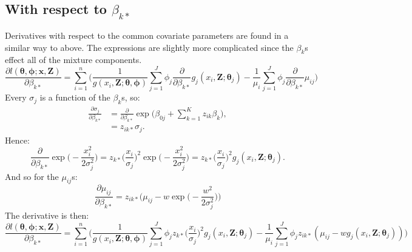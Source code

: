 \documentclass[useAMS,referee, usegraphicx]{biom}
\begin{document}
\subsection*{With respect to $\beta_{k*}$}

Derivatives with respect to the common covariate parameters are found in a similar way to above. The expressions are slightly more complicated since the $\beta_k$s effect all of the mixture components.
\begin{equation*}
\frac{\partial l(\bm{\theta},\bm{\phi}; \mathbf{x},\mathbf{Z})}{\partial \beta_{k*}} = \sum_{i=1}^n \Big( \frac{1}{g(x_i,\mathbf{Z}; \bm{\theta},\bm{\phi})} \sum_{j=1}^J \phi_j \frac{\partial}{\partial \beta_{k*}} g_j(x_i,\mathbf{Z}; \bm{\theta}_j) - \frac{1}{\mu_i} \sum_{j=1}^J \phi_j \frac{\partial}{\partial \beta_{k*}}\mu_{ij}\Big)
\end{equation*}
Every $\sigma_{j}$ is a function of the $\beta_{k}$s, so:
\begin{align*}
\frac{\partial \sigma_{j}}{\partial \beta_{k*}} &= \frac{\partial}{\partial \beta_{k*}} \exp \Big( \beta_{0j} + \sum_{k=1}^K z_{ik} \beta_{k}\Big),\\
&= z_{ik*}\sigma_{j}.
\end{align*}
Hence:
\begin{equation*}
 \frac{\partial}{\partial \beta_{k*}} \exp\Big( -\frac{x_i^2}{2\sigma_{j}^2} \Big) = z_{k*} \Big( \frac{x_i}{\sigma_{j}}\Big)^2 \exp \Big(-\frac{x_i^2}{2 \sigma_{j}^2}\Big) = z_{k*} \Big( \frac{x_i}{\sigma_{j}}\Big)^2 g_j(x_i,\mathbf{Z}; \bm{\theta}_j).
 \label{detfct-deriv-k}
\end{equation*}
And so for the $\mu_{ij}$s:
\begin{equation*}
\frac{\partial \mu_{ij}}{\partial \beta_{k*}} = z_{ik*} \Big( \mu_{ij} - w \exp\Big( -\frac{w^2}{2\sigma_{j}^2} \Big) \Big)
\end{equation*}
The derivative is then:
\begin{equation*}
\frac{\partial l(\bm{\theta},\bm{\phi}; \mathbf{x},\mathbf{Z})}{\partial \beta_{k*}} = \sum_{i=1}^n \Big( \frac{1}{g(x_i,\mathbf{Z}; \bm{\theta},\bm{\phi})} \sum_{j=1}^J \phi_j  z_{k*} \Big( \frac{x_i}{\sigma_{j}}\Big)^2 g_j(x_i,\mathbf{Z}; \bm{\theta}_j) - \frac{1}{\mu_i} \sum_{j=1}^J \phi_j z_{ik*} ( \mu_{ij} - w g_j(x_i,\mathbf{Z}; \bm{\theta}_j) )\Big)
\end{equation*}
\end{document}

